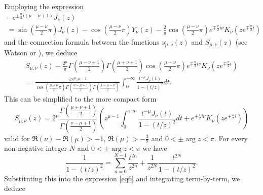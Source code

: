 \documentclass[a4paper,twoside,10pt]{amsart}
\numberwithin{equation}{section}
\begin{document}
Employing the expression
\begin{multline*}
 - e^{ \pm \frac{\pi }{2}i\left( {\mu  - \nu  + 1} \right)} J_\nu  \left( z \right) \\ = \sin \left( {\frac{{\mu  - \nu }}{2}\pi } \right)J_\nu  \left( z \right) - \cos \left( {\frac{{\mu  - \nu }}{2}\pi } \right)Y_\nu  \left( z \right) - \frac{2}{\pi }\cos \left( {\frac{{\mu  - \nu }}{2}\pi } \right)e^{ \mp \frac{\pi }{2}i\nu } K_\nu  \left( {ze^{ \mp \frac{\pi }{2}i} } \right)
\end{multline*}
and the connection formula between the functions $s_{\mu ,\nu } \left( z \right)$ and $S_{\mu ,\nu } \left( z \right)$ (see Watson \cite[p. 347, expression (3)]{Watson} or \cite[11.9.E5]{NIST}), we deduce
\begin{multline*}
S_{\mu ,\nu } \left( z \right) - \frac{{2^\mu  }}{\pi }\Gamma \left( {\frac{{\mu  - \nu  + 1}}{2}} \right)\Gamma \left( {\frac{{\mu  + \nu  + 1}}{2}} \right)\cos \left( {\frac{{\mu  - \nu }}{2}\pi } \right)e^{ \mp \frac{\pi }{2}i\nu } K_\nu  \left( {ze^{ \mp \frac{\pi }{2}i} } \right) \\ = \frac{{\pi 2^\mu  z^{\mu  - 1} }}{{\cos \left( {\frac{{\mu  + \nu }}{2}\pi } \right)\Gamma \left( {\frac{{\nu  - \mu  + 1}}{2}} \right)\Gamma \left( {\frac{{1 - \mu  - \nu }}{2}} \right)}}\int_0^{ + \infty } {\frac{{t^{ - \mu } J_\nu  \left( t \right)}}{{1 - \left( {t/z} \right)^2 }}dt} .
\end{multline*}
This can be simplified to the more compact form
\begin{equation}\label{eq6}
S_{\mu ,\nu } \left( z \right) = 2^\mu  \frac{{\Gamma \left( {\frac{{\mu  + \nu  + 1}}{2}} \right)}}{{\Gamma \left( {\frac{{\nu  - \mu  + 1}}{2}} \right)}}\left( {z^{\mu  - 1} \int_0^{ + \infty } {\frac{{t^{ - \mu } J_\nu  \left( t \right)}}{{1 - \left( {t/z} \right)^2 }}dt}  + e^{ \mp \frac{\pi }{2}i\nu } K_\nu  \left( {ze^{ \mp \frac{\pi }{2}i} } \right)} \right)
\end{equation}
valid for $\Re \left( \nu  \right) - \Re \left( \mu  \right) >  - 1$, $\Re \left( \mu  \right) >  - \frac{3}{2}$ and $0 <  \pm \arg z < \pi$. For every non-negative integer $N$ and $0 <  \pm \arg z < \pi$ we have
\[
\frac{1}{{1 - \left( {t/z} \right)^2 }} = \sum\limits_{n = 0}^{N - 1} {\frac{{t^{2n} }}{{z^{2n} }}}  + \frac{1}{{z^{2N} }}\frac{{t^{2N} }}{{1 - \left( {t/z} \right)^2 }}.
\]
Substituting this into the expression \eqref{eq6} and integrating term-by-term, we deduce
\end{document}
